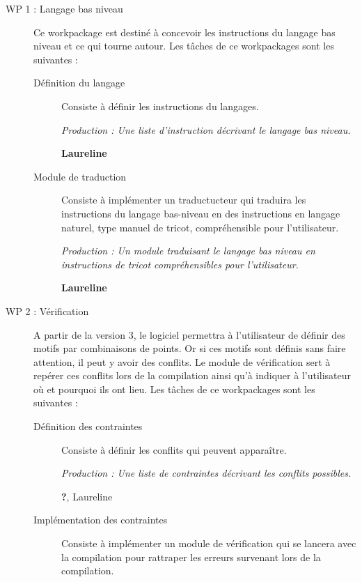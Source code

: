 \documentclass{article}
\begin{document}
\begin{description}
\item[WP 1 : Langage bas niveau] Ce workpackage est destiné à concevoir les instructions du langage bas niveau et ce qui tourne autour. Les tâches de ce workpackages sont les suivantes :

    \begin{description}
    \item[Définition du langage] Consiste à définir les instructions du langages.

      \textit{Production : Une liste d'instruction décrivant le langage bas niveau.}

      \textbf{Laureline}

    \item[Module de traduction] Consiste à implémenter un traductucteur qui traduira les instructions du langage bas-niveau en des instructions en langage naturel, type manuel de tricot, compréhensible pour l'utilisateur.

      \textit{Production : Un module traduisant le langage bas niveau en instructions de tricot compréhensibles pour l'utilisateur.}

      \textbf{Laureline}
    \end{description}

\medskip

\item[WP 2 : Vérification] A partir de la version 3, le logiciel permettra à l'utilisateur de définir des motifs par combinaisons de points. Or si ces motifs sont définis sans faire attention, il peut y avoir des conflits. Le module de vérification sert à repérer ces conflits lors de la compilation ainsi qu'à indiquer à l'utilisateur où et pourquoi ils ont lieu. Les tâches de ce workpackages sont les suivantes :

    \begin{description}
    \item[Définition des contraintes] Consiste à définir les conflits qui peuvent apparaître.

      \textit{Production : Une liste de contraintes décrivant les conflits possibles.}

      \textbf{?}, Laureline

    \item[Implémentation des contraintes] Consiste à implémenter un module de vérification qui se lancera avec la compilation pour rattraper les erreurs survenant lors de la compilation.


\end{description}
\end{description}
\end{document}

